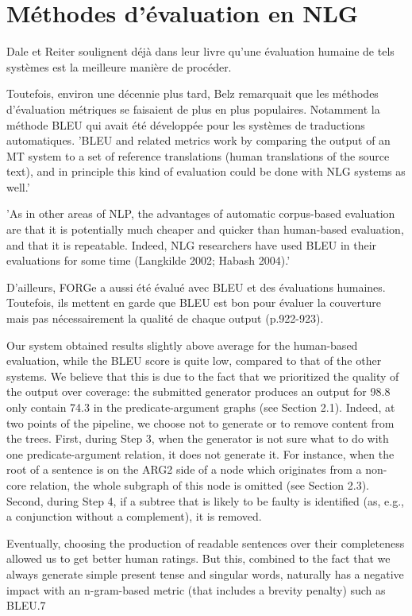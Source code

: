\section{Méthodes d'évaluation en NLG}
 
Dale et Reiter soulignent déjà dans leur livre qu'une évaluation humaine de tels systèmes est la meilleure manière de procéder. 

Toutefois, environ une décennie plus tard, Belz remarquait que les méthodes d'évaluation métriques se faisaient de plus en plus populaires. Notamment la méthode BLEU qui avait été développée pour les systèmes de traductions automatiques. 'BLEU and related metrics work by comparing the output of an MT system to a set of reference translations (human translations of the source text), and in principle this kind of evaluation could be done with NLG systems as well.'

'As in other areas of NLP, the advantages of automatic corpus-based evaluation are that it is potentially much cheaper and quicker than human-based evaluation, and that it is repeatable. Indeed, NLG researchers have used BLEU in their evaluations for some time (Langkilde 2002; Habash 2004).'

D'ailleurs, FORGe a aussi été évalué avec BLEU et des évaluations humaines. Toutefois, ils mettent en garde que BLEU est bon pour évaluer la couverture mais pas nécessairement la qualité de chaque output (p.922-923).

Our system obtained results slightly above average
for the human-based evaluation, while the
BLEU score is quite low, compared to that of the
other systems. We believe that this is due to the
fact that we prioritized the quality of the output
over coverage: the submitted generator produces
an output for 98.8%
only contain 74.3%
in the predicate-argument graphs (see Section
2.1). Indeed, at two points of the pipeline, we
choose not to generate or to remove content from
the trees. First, during Step 3, when the generator
is not sure what to do with one predicate-argument
relation, it does not generate it. For instance, when
the root of a sentence is on the ARG2 side of a
node which originates from a non-core relation,
the whole subgraph of this node is omitted (see
Section 2.3). Second, during Step 4, if a subtree
that is likely to be faulty is identified (as, e.g., a
conjunction without a complement), it is removed.

Eventually, choosing the
production of readable sentences over their completeness
allowed us to get better human ratings.
But this, combined to the fact that we always generate
simple present tense and singular words, naturally
has a negative impact with an n-gram-based
metric (that includes a brevity penalty) such as
BLEU.7
 
